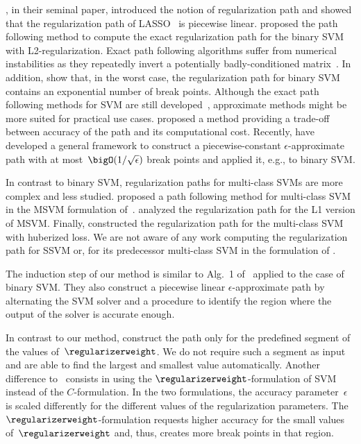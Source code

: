 \documentclass{article}
\begin{document}
\citet{EfronRegPathLasso_04}, in their seminal paper, introduced the notion of regularization path and showed that the regularization path of  LASSO~ is piecewise linear.
 proposed the path following method to compute the exact regularization path for the binary SVM with L2-regularization.
Exact path following algorithms suffer from numerical instabilities as they repeatedly invert a potentially badly-conditioned matrix~.
In addition,  show that, in the worst case, the regularization path for binary SVM contains an exponential number of break points.
Although the exact path following methods for SVM are still developed~, approximate methods might be more suited for practical use cases.
 proposed a method providing a trade-off between accuracy of the path and its computational cost.
Recently,  have developed a general framework to construct a piecewise-constant $\epsilon$-approximate path with at most~$\bigO(1/\sqrt{\epsilon})$ break points and applied it, e.g., to binary SVM. 

In contrast to binary SVM, regularization paths for multi-class SVMs are more complex and less studied.
 proposed a path following method for multi-class SVM in the MSVM formulation of~.  analyzed the regularization path for the L1 version of MSVM.
Finally,  constructed the regularization path for the multi-class SVM with huberized loss.
We are not aware of any work computing the regularization path for SSVM or, for its predecessor multi-class SVM in the formulation of .

The induction step of our method is similar to Alg.~1 of~ applied to the case of binary SVM.
They also construct a piecewise linear $\epsilon$-approximate path by alternating the SVM solver and a procedure to identify the region where the output of the solver is accurate enough. 

In contrast to our method,  construct the path only for the predefined segment of the values of~$\regularizerweight$. We do not require such a segment as input and are able to find the largest and smallest value automatically.
Another difference to~ consists in using the $\regularizerweight$-formulation of SVM instead of the $C$-formulation. In the two formulations, the accuracy parameter~$\epsilon$ is scaled differently for the different values of the regularization parameters. The $\regularizerweight$-formulation requests higher accuracy for the small values of~$\regularizerweight$ and, thus, creates more break points in that region.
\end{document}
